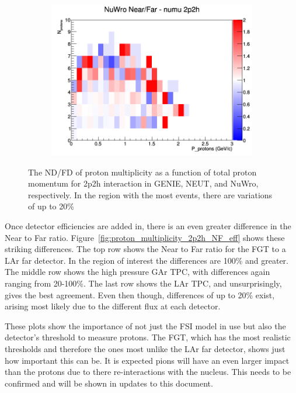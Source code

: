 \documentclass[12pt]{article}
\begin{document}
\begin{figure}[h]
\begin{subfigure}[b]{0.32\textwidth}
\includegraphics[width=\linewidth]{N_P/nominal/protons/ratios/2p2h_NuWro_numu_NF_N_P.png}
\end{subfigure}
\caption{The ND/FD of proton multiplicity as a function of total proton momentum for 2p2h interaction in GENIE, NEUT, and NuWro, respectively. In the region with the most events, there are variations of up to 20\%}
\label{fig:proton_multiplicity_2p2h_NF}
\end{figure}

Once detector efficiencies are added in, there is an even greater difference in the Near to Far ratio.  
Figure~\ref{fig:proton_multiplicity_2p2h_NF_eff} shows these striking differences.  
The top row shows the Near to Far ratio for the FGT to a LAr far detector.  
In the region of interest the differences are 100\% and greater.
The middle row shows the high pressure GAr TPC, with differences again ranging from 20-100\%.
The last row shows the LAr TPC, and unsurprisingly, gives the best agreement. 
Even then though, differences of up to 20\% exist, arising most likely due to the different flux at each detector. 

These plots show the importance of not just the FSI model in use but also the detector's threshold to measure protons. 
The FGT, which has the most realistic thresholds and therefore the ones most unlike the LAr far detector, shows just how important this can be.
It is expected pions will have an even larger impact than the protons due to there re-interactions with the nucleus.  
This needs to be confirmed and will be shown in updates to this document. 
\end{document}
